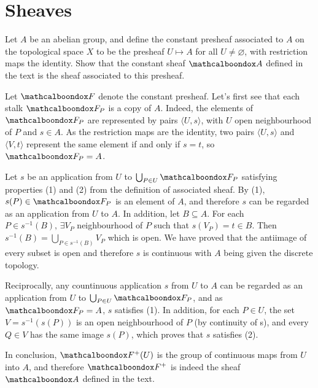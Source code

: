 \section{Sheaves}

\begin{ex}
	Let $A$ be an abelian group, and define the constant presheaf associated to $A$ on the topological space $X$ to be the presheaf $U \mapsto A$ for all $U \neq \varnothing$, with restriction maps the identity. Show that the constant sheaf $\sA$ defined in the text is the sheaf associated to this presheaf.
\end{ex}

\begin{sol}
	Let $\sF$ denote the constant presheaf. Let's first see that each stalk $\sF_P$ is a copy of $A$. Indeed, the elements of $\sF_P$ are represented by pairs $\langle U, s \rangle$, with $U$ open neighbourhood of $P$ and $s \in A$. As the restriction maps are the identity, two pairs $\langle U,s \rangle$ and $\langle V, t \rangle$ represent the same element if and only if $s = t$, so $\sF_P = A$.

	Let $s$ be an application from $U$ to $\bigcup_{P \in U} \sF_P$ satisfying properties (1) and (2) from the definition of associated sheaf. By (1), $s(P) \in \sF_P$ is an element of $A$, and therefore $s$ can be regarded as an application from $U$ to $A$. In addition, let $B \subseteq A$. For each $P \in s^{-1}(B), \, \exists V_{P}$ neighbourhood of $P$ such that $s(V_P) = t \in B$. Then $s^{-1}(B) = \bigcup_{P \in s^{-1}(B)} V_P$ which is open. We have proved that the antiimage of every subset is open and therefore $s$ is continuous with $A$ being given the discrete topology.

	Reciprocally, any countinuous application $s$ from $U$ to $A$ can be regarded as an application from $U$ to $\bigcup_{P \in U} \sF_P$, and as $\sF_P = A$, $s$ satisfies (1). In addition, for each $P \in U$, the set $V = s^{-1}(s(P))$ is an open neighbourhood of $P$ (by continuity of s), and every $Q \in V$ has the same image $s(P)$, which proves that $s$ satisfies (2).

	In conclusion, $\sF^{+}(U)$ is the group of continuous maps from $U$ into $A$, and therefore $\sF^{+}$ is indeed the sheaf $\sA$ defined in the text.
\end{sol}

